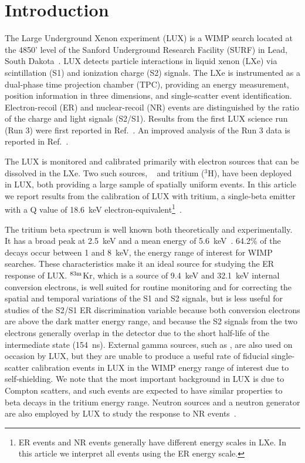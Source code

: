 \section{Introduction}

The Large Underground Xenon experiment (LUX) is a WIMP search located at the 4850' level of the Sanford Underground Research Facility (SURF) in Lead, South Dakota~\cite{lux-nim}. LUX detects particle interactions in liquid xenon (LXe) via scintillation (S1) and ionization charge (S2) signals. The LXe is instrumented as a dual-phase time projection chamber (TPC), providing an energy measurement, position information in three dimensions, and single-scatter event identification. Electron-recoil (ER) and nuclear-recoil (NR) events are distinguished by the ratio of the charge and light signals (S2/S1). Results from the first LUX science run (Run 3) were first reported in Ref.~\cite{lux-prl}. An improved analysis of the Run 3 data is reported in Ref.~\cite{lux-reanalysis}.

The LUX is monitored and calibrated primarily with electron sources that can be dissolved in the LXe. Two such sources,  \krsrc~\cite{Kastens:2009rt, Baudis} and tritium ($^{3}$H), have been deployed in LUX, both providing a large sample of spatially uniform events. In this article we report results from the calibration of LUX with tritium, a single-beta emitter with a Q value of 18.6~keV electron-equivalent\footnote{ER events and NR events generally have different energy scales in LXe. In this article we interpret all events using the ER energy scale.}~\cite{Tritium_Q}. 

The tritium beta spectrum is well known both theoretically and experimentally. It has a broad peak at 2.5~keV and a mean energy of 5.6~keV~\cite{Tritium_Mean,Tritium_Eq,Drexlin:2013lha}. 64.2\% of the decays occur between 1 and 8~keV, the energy range of interest for WIMP searches. These characteristics make it an ideal source for studying the ER response of LUX.  $\rm ^{83m}$Kr, which is a source of 9.4~keV and 32.1~keV internal conversion electrons, is well suited for routine monitoring and for correcting the spatial and temporal variations of the S1 and S2 signals, but is less useful for studies of the S2/S1 ER discrimination variable because both conversion electrons are above the dark matter energy range, and because the S2 signals from the two electrons generally overlap in the detector due to the short half-life of the intermediate state (154~ns). External gamma sources, such as \cssrc,  are also used on occasion by LUX, but they are unable to produce a useful rate of fiducial single-scatter calibration events in LUX in the WIMP energy range of interest due to self-shielding. We note that the most important background in LUX is due to Compton scatters, and such events are expected to have similar properties to beta decays in the tritium energy range. Neutron sources and a neutron generator are also employed by LUX to study the response to NR events~\cite{DD-paper}.


